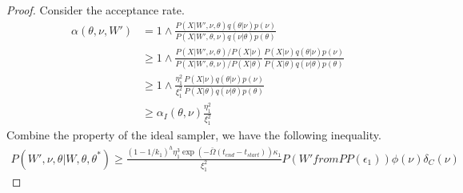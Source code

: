 \begin{proof}
Consider the acceptance rate.
\begin{align*}
\alpha(\theta, \nu, W') &= 1 \wedge \frac{P(X | W', \nu, \theta) q(\theta|\nu)p(\nu)}{P(X | W', \theta, \nu)q(\nu|\theta)p(\theta)}\\
& \geq 1 \wedge \frac{P(X|W', \nu, \theta) / P(X|\nu)}{P(X|W', \theta, \nu) / P(X|\theta)} \frac{P(X | \nu) q(\theta|\nu)p(\nu)}{P(X | \theta)q(\nu|\theta)p(\theta)}\\
& \geq 1 \wedge \frac{\eta_1^2}{\xi_1^2} 	\frac{P(X | \nu) q(\theta|\nu)p(\nu)}{P(X | \theta)q(\nu|\theta)p(\theta)}\\
& \geq \alpha_I(\theta, \nu)\frac{\eta_1^2}{\xi_1^2}
\end{align*}
Combine the property of the ideal sampler, we have the following inequality.
\begin{align*}
P(W', \nu, \theta | W, \theta, \theta^*) \geq \frac{(1 - 1/k_1)^{h} \eta_1^3 \exp(-\bar{\Omega}(t_{end} - t_{start}))\kappa_1}{\xi_1^2} P(W' from PP(\epsilon_1))\phi(\nu)\delta_C(\nu)
\end{align*}
\end{proof}

